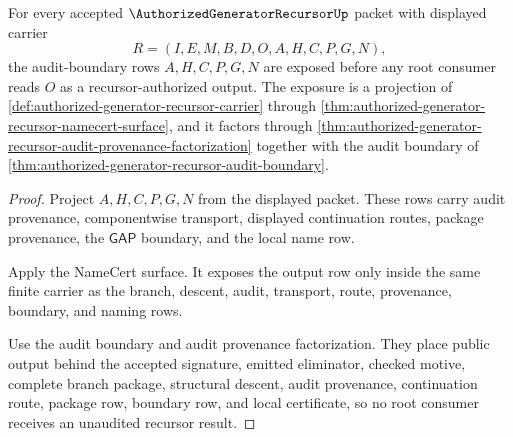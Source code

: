 \begin{theorem}
\label{thm:authorized-generator-recursor-root-audit-boundary-exposure}
For every accepted $\AuthorizedGeneratorRecursorUp$ packet with displayed carrier
$$
R=(I,E,M,B,D,O,A,H,C,P,G,N),
$$
the audit-boundary rows $A,H,C,P,G,N$ are exposed before any root consumer reads $O$ as a recursor-authorized output. The exposure is a projection of \autoref{def:authorized-generator-recursor-carrier} through \autoref{thm:authorized-generator-recursor-namecert-surface}, and it factors through \autoref{thm:authorized-generator-recursor-audit-provenance-factorization} together with the audit boundary of \autoref{thm:authorized-generator-recursor-audit-boundary}.
\end{theorem}
\begin{proof}
Project $A,H,C,P,G,N$ from the displayed packet. These rows carry audit provenance, componentwise transport, displayed continuation routes, package provenance, the $\mathsf{GAP}$ boundary, and the local name row.

Apply the NameCert surface. It exposes the output row only inside the same finite carrier as the branch, descent, audit, transport, route, provenance, boundary, and naming rows.

Use the audit boundary and audit provenance factorization. They place public output behind the accepted signature, emitted eliminator, checked motive, complete branch package, structural descent, audit provenance, continuation route, package row, boundary row, and local certificate, so no root consumer receives an unaudited recursor result.
\end{proof}
